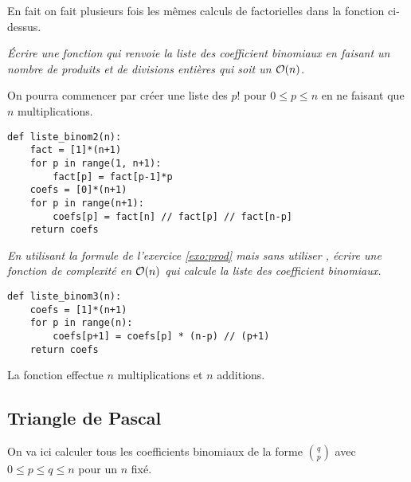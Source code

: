 En fait on fait plusieurs fois les mêmes calculs de factorielles dans la fonction ci-dessus.
\begin{Exercise}
\it Écrire une fonction  qui renvoie la liste des coefficient binomiaux en faisant un nombre de produits et de divisions entières qui soit un ${\cal O}(n)$.

On pourra commencer par créer une liste des $p!$ pour $0\le p \le n$ en ne faisant que $n$ multiplications.
\end{Exercise}
\begin{Answer}
\begin{lstlisting}
def liste_binom2(n):
    fact = [1]*(n+1)
    for p in range(1, n+1):
        fact[p] = fact[p-1]*p
    coefs = [0]*(n+1)
    for p in range(n+1):
        coefs[p] = fact[n] // fact[p] // fact[n-p]
    return coefs
\end{lstlisting}
\end{Answer}
\begin{Exercise}
\it En utilisant la formule de l'exercice \ref{exo:prod} mais sans utiliser , écrire une fonction  de complexité en ${\cal O}(n)$ qui calcule la liste des coefficient binomiaux.
\end{Exercise}
\begin{Answer}
\begin{lstlisting}
def liste_binom3(n):
    coefs = [1]*(n+1)
    for p in range(n):
        coefs[p+1] = coefs[p] * (n-p) // (p+1)
    return coefs
\end{lstlisting}
La fonction effectue $n$ multiplications et $n$ additions.
\end{Answer}
\subsection{Triangle de Pascal} 
On va ici calculer tous les coefficients binomiaux de la forme $\binom qp$ avec $0\le p \le q \le n$ pour un $n$ fixé.

